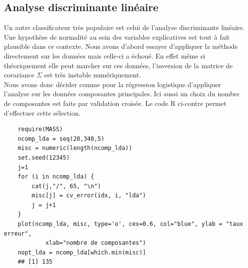 \documentclass[12pt,a4paper]{article}
\begin{document}
\subsection{Analyse discriminante linéaire}
Un autre classificateur très populaire est celui de l'analyse discriminante linéaire. Une hypothèse de normalité au sein des variables explicatives est tout à fait plausible dans ce contexte. Nous avons d'abord essayer d'appliquer la méthode directement sur les données mais celle-ci a échoué. En effet même si théoriquement elle peut marcher sur ces données, l'inversion de la matrice de covariance $\Sigma$ est très instable numériquement.\\
Nous avons donc décider comme pour la régression logistique d'appliquer l'analyse sur les données composantes principales. Ici aussi un choix du nombre de composantes est faits par validation croisée. Le code R ci-contre permet d'effectuer cette sélection.\vspace{2mm}
\begin{lstlisting}
	require(MASS)
	ncomp_lda = seq(20,340,5)
	misc = numeric(length(ncomp_lda))
	set.seed(12345)
	j=1
	for (i in ncomp_lda) {
		cat(j,"/", 65, "\n")
		misc[j] = cv_error(idx, i, "lda")
		j = j+1
	}
	plot(ncomp_lda, misc, type='o', cex=0.6, col="blue", ylab = "taux erreur",
			xlab="nombre de composantes")
	nopt_lda = ncomp_lda[which.min(misc)]
	## [1] 135
\end{lstlisting}
\end{document}
